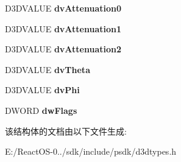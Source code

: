 \begin{DoxyCompactItemize}
D3\+D\+V\+A\+L\+UE {\bfseries dv\+Attenuation0}
\item 
\mbox{\label{struct___d3_d_l_i_g_h_t2_abed243d58bfe4e135ef0d4e98537e583}} 
D3\+D\+V\+A\+L\+UE {\bfseries dv\+Attenuation1}
\item 
\mbox{\label{struct___d3_d_l_i_g_h_t2_aa4abd59102df972a5f586df175faf556}} 
D3\+D\+V\+A\+L\+UE {\bfseries dv\+Attenuation2}
\item 
\mbox{\label{struct___d3_d_l_i_g_h_t2_af3e8a7704156fc18c9c8c213c309dea2}} 
D3\+D\+V\+A\+L\+UE {\bfseries dv\+Theta}
\item 
\mbox{\label{struct___d3_d_l_i_g_h_t2_ac7c52e182b7961f1c8194c592c18ea33}} 
D3\+D\+V\+A\+L\+UE {\bfseries dv\+Phi}
\item 
\mbox{\label{struct___d3_d_l_i_g_h_t2_aa643cf870349b43716eebfb3a415b9d8}} 
D\+W\+O\+RD {\bfseries dw\+Flags}
\end{DoxyCompactItemize}


该结构体的文档由以下文件生成\+:\begin{DoxyCompactItemize}
\item 
E\+:/\+React\+O\+S-\/0../sdk/include/psdk/d3dtypes.\+h\end{DoxyCompactItemize}
